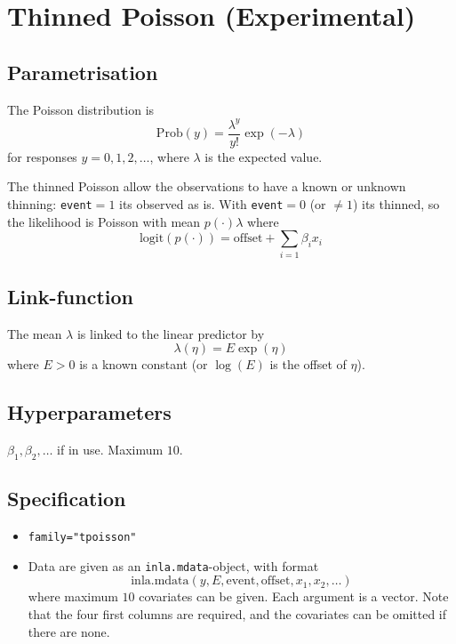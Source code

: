 \documentclass[a4paper,11pt]{article}
\begin{document}
\section*{Thinned Poisson (Experimental)}

\subsection*{Parametrisation}

The Poisson distribution is
\begin{displaymath}
    \text{Prob}(y) = \frac{\lambda^{y}}{y!}\exp(-\lambda)
\end{displaymath}
for responses $y=0, 1, 2, \ldots$, where $\lambda$ is the expected
value.

The thinned Poisson allow the observations to have a known or unknown
thinning: \texttt{event}$=1$ its observed as is. With
\texttt{event}$=0$ (or $\not=1$) its thinned, so the likelihood is
Poisson with mean $p(\cdot) \lambda$ where
\begin{displaymath}
    \text{logit}(p(\cdot)) = \text{offset} + \sum_{i=1} \beta_i x_i
\end{displaymath}

\subsection*{Link-function}

The mean $\lambda$ is linked to the linear predictor by
\begin{displaymath}
    \lambda(\eta) = E \exp(\eta)
\end{displaymath}
where $E>0$ is a known constant (or $\log(E)$ is the offset of $\eta$).

\subsection*{Hyperparameters}

$\beta_1, \beta_2, \ldots$ if in use. Maximum $10$. 

\subsection*{Specification}

\begin{itemize}
\item \texttt{family="tpoisson"}
\item Data are given as an \texttt{inla.mdata}-object, with format
    \begin{displaymath}
        \text{inla.mdata}(y, E, \text{event}, \text{offset}, x_1,
        x_2, \ldots)
    \end{displaymath}
    where maximum $10$ covariates can be given. Each argument is a
    vector. Note that the four first columns are required, and the
    covariates can be omitted if there are none.
\end{itemize}
\end{document}
